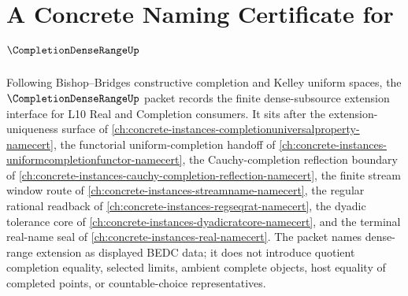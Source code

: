 \chapter{A Concrete Naming Certificate for $\CompletionDenseRangeUp$}
\label{ch:concrete-instances-completion-dense-range-namecert}

Following Bishop--Bridges constructive completion and Kelley uniform spaces, the $\CompletionDenseRangeUp$ packet records the finite dense-subsource extension interface for L10 Real and Completion consumers. It sits after the extension-uniqueness surface of \autoref{ch:concrete-instances-completionuniversalproperty-namecert}, the functorial uniform-completion handoff of \autoref{ch:concrete-instances-uniformcompletionfunctor-namecert}, the Cauchy-completion reflection boundary of \autoref{ch:concrete-instances-cauchy-completion-reflection-namecert}, the finite stream window route of \autoref{ch:concrete-instances-streamname-namecert}, the regular rational readback of \autoref{ch:concrete-instances-regseqrat-namecert}, the dyadic tolerance core of \autoref{ch:concrete-instances-dyadicratcore-namecert}, and the terminal real-name seal of \autoref{ch:concrete-instances-real-namecert}. The packet names dense-range extension as displayed BEDC data; it does not introduce quotient completion equality, selected limits, ambient complete objects, host equality of completed points, or countable-choice representatives.

